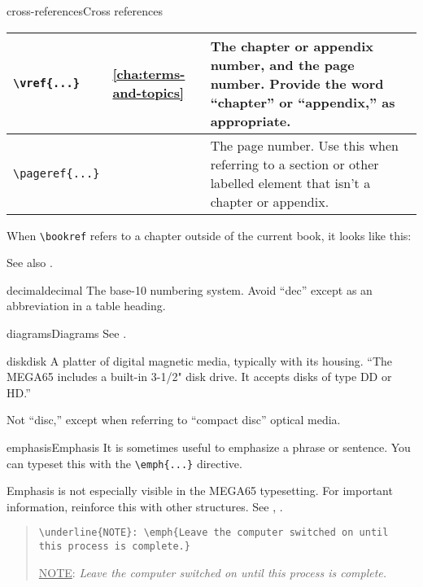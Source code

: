 \begin{sgentry}{cross-references}{Cross references}
\begin{center}
\begin{tabular}{|l|l|p{6cm}|}
        \texttt{{\textbackslash}vref\{...\}} &
        \vref{cha:terms-and-topics} &
        The chapter or appendix number, and the page number. Provide the word ``chapter'' or ``appendix,'' as appropriate. \\
        \hline

        \texttt{{\textbackslash}pageref\{...\}} &
        \pageref{cha:terms-and-topics} &
        The page number. Use this when referring to a section or other labelled element that isn't a chapter or appendix. \\
        \hline
    \end{tabular}
    \end{center}

    When \texttt{{\textbackslash}bookref} refers to a chapter outside of the current book, it looks like this: 

    See also .
\end{sgentry}

\begin{sgentry}{decimal}{decimal}
    The base-10 numbering system. Avoid ``dec'' except as an abbreviation in a table heading.
\end{sgentry}

\begin{sgentry}{diagrams}{Diagrams}
    See .
\end{sgentry}

\begin{sgentry}{disk}{disk}
    A platter of digital magnetic media, typically with its housing. ``The MEGA65 includes a built-in 3-1/2" disk drive. It accepts disks of type DD or HD.''

    Not ``disc,'' except when referring to ``compact disc'' optical media.
\end{sgentry}

\begin{sgentry}{emphasis}{Emphasis}
    It is sometimes useful to emphasize a phrase or sentence. You can typeset this with the \texttt{{\textbackslash}emph\{...\}} directive.

    Emphasis is not especially visible in the MEGA65 typesetting. For important information, reinforce this with other structures. See , .

    \begin{quote}
        \texttt{{\textbackslash}underline\{NOTE\}: {\textbackslash}emph\{Leave the computer switched on until this process is complete.\}}

        \hrulefill

        \underline{NOTE}: \emph{Leave the computer switched on until this process is complete.}
    \end{quote}
\end{sgentry}

